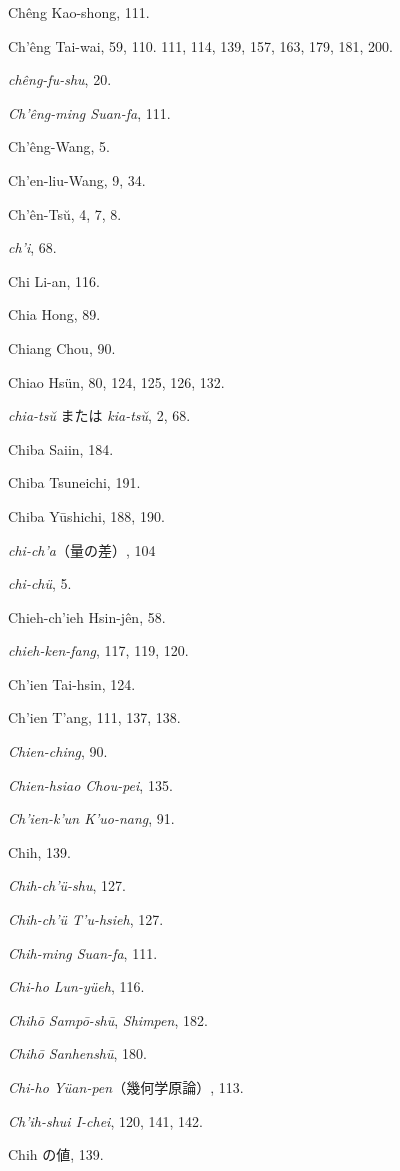 \documentclass[11pt]{article}
\begin{document}
Chêng Kao-shong, 111.\par
Ch'êng Tai-wai, 59, 110. 111, 114, 139, 157, 163, 179, 181, 200.\par
\emph{chêng-fu-shu}, 20.\par
\emph{Ch'êng-ming Suan-fa}, 111.\par
Ch'êng-Wang, 5.\par
Ch'en-liu-Wang, 9, 34.\par
Ch'ên-Tsŭ, 4, 7, 8.\par
\emph{ch'i}, 68.\par
Chi Li-an, 116.\par
Chia Hong, 89.\par
Chiang Chou, 90.\par
Chiao Hsün, 80, 124, 125, 126, 132.\par
\emph{chia-tsŭ} または \emph{kia-tsŭ}, 2, 68.\par
Chiba Saiin, 184.\par
Chiba Tsuneichi, 191.\par
Chiba Yūshichi, 188, 190.\par
\emph{chi-ch'a}（量の差）, 104\par
\emph{chi-chü}, 5.\par
Chieh-ch'ieh Hsin-jên, 58.\par
\emph{chieh-ken-fang}, 117, 119, 120.\par
Ch'ien Tai-hsin, 124.\par
Ch'ien T'ang, 111, 137, 138.\par
\emph{Chien-ching}, 90.\par
\emph{Chien-hsiao Chou-pei}, 135.\par
\emph{Ch'ien-k'un K'uo-nang}, 91.\par
Chih, 139.\par
\emph{Chih-ch'ü-shu}, 127.\par
\emph{Chih-ch'ü T'u-hsieh}, 127.\par
\emph{Chih-ming Suan-fa}, 111.\par
\emph{Chi-ho Lun-yüeh}, 116.\par
\emph{Chihō Sampō-shū}, \emph{Shimpen}, 182.\par
\emph{Chihō Sanhenshū}, 180.\par
\emph{Chi-ho Yüan-pen}（幾何学原論）, 113.\par
\emph{Ch'ih-shui I-chei}, 120, 141, 142.\par
Chih の値, 139.
\end{document}
